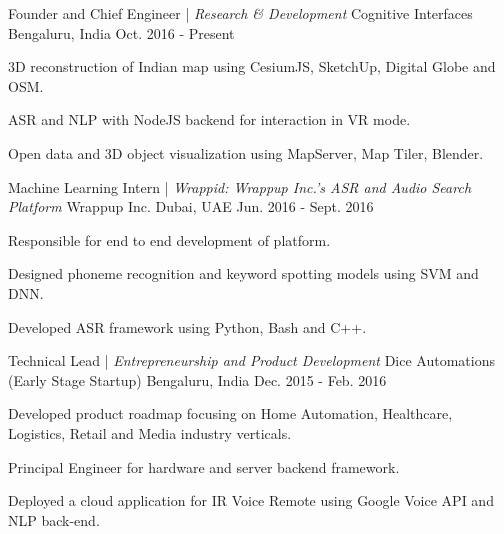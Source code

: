 \vspace{-1em}
\begin{cventries}
\cventry
	{Founder and Chief Engineer | \textit{Research \& Development}}
	{Cognitive Interfaces}
	{Bengaluru, India}
	{Oct. 2016 - Present}
	{ \begin{cvitems}
		\item {3D reconstruction of Indian map using CesiumJS, SketchUp, Digital Globe and OSM.} %
		\item {ASR and NLP with NodeJS backend for interaction in VR mode.}
		\item {Open data and 3D object visualization using MapServer, Map Tiler, Blender.} %
	  \end{cvitems}	
	}

	\cventry
	{Machine Learning Intern | \textit{Wrappid: Wrappup Inc.'s ASR and Audio Search Platform}}
	{Wrappup Inc.}
	{Dubai, UAE}
	{Jun. 2016 - Sept. 2016}
	{ \begin{cvitems}
		\item {Responsible for end to end development of platform.}
		\item {Designed phoneme recognition and keyword spotting models using SVM and DNN.}
		\item {Developed ASR framework using Python, Bash and C++.}		
	  \end{cvitems}
	}

\cventry
  	{Technical Lead | \textit{Entrepreneurship and Product Development}}
  	{Dice Automations (Early Stage Startup)}
  	{Bengaluru, India}
  	{Dec. 2015 - Feb. 2016}
  	{ \begin{cvitems}
  		\item {Developed product roadmap focusing on Home Automation, Healthcare, Logistics, Retail and Media industry verticals.}
		\item {Principal Engineer for hardware and server backend framework.}
		\item {Deployed a cloud application for IR Voice Remote using Google Voice API and NLP back-end.}
		\end{cvitems}  	
  	}
  	  

\end{cventries}
